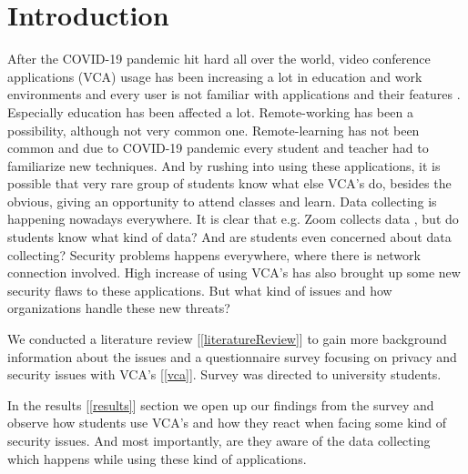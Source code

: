 \documentclass[utf8,english]{gradu3}
\begin{document}
\mainmatter


\sloppypar 



\chapter{Introduction}
\label{introduction}
After the COVID-19 pandemic hit hard all over the world, video conference applications (VCA) usage has been increasing a lot in education and work environments and every user is not familiar with applications and their features \parencite{zsolt2020}. Especially education has been affected a lot. Remote-working has been a possibility, although not very common one. Remote-learning has not been common and due to COVID-19 pandemic every student and teacher had to familiarize new techniques. And by rushing into using these applications, it is possible that very rare group of students know what else VCA's do, besides the obvious, giving an opportunity to attend classes and learn. Data collecting is happening nowadays everywhere. It is clear that e.g. Zoom collects data \parencite{zoomdata}, but do students know what kind of data? And are students even concerned about data collecting?
Security problems happens everywhere, where there is network connection involved. High increase of using VCA's has also brought up some new security flaws to these applications. But what kind of issues and how organizations handle these new threats?
%

We conducted a literature review [\ref{literatureReview}] to gain more background information about the issues and a questionnaire survey focusing on privacy and security issues with VCA's [\ref{vca}]. Survey was directed to university students.
%

%
In the results [\ref{results}] section we open up our findings from the survey and observe how students use VCA's and how they react when facing some kind of security issues. And most importantly, are they aware of the data collecting which happens while using these kind of applications.
\end{document}
